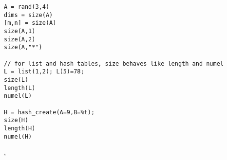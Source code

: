 \begin{examples}
\begin{Verbatim}
A = rand(3,4)
dims = size(A)
[m,n] = size(A)
size(A,1)
size(A,2)
size(A,"*")

// for list and hash tables, size behaves like length and numel
L = list(1,2); L(5)=78; 
size(L)
length(L)
numel(L)

H = hash_create(A=9,B=%t);
size(H)
length(H)
numel(H)
\end{Verbatim}
\end{examples}

\begin{manseealso}
  ,  
\end{manseealso}

